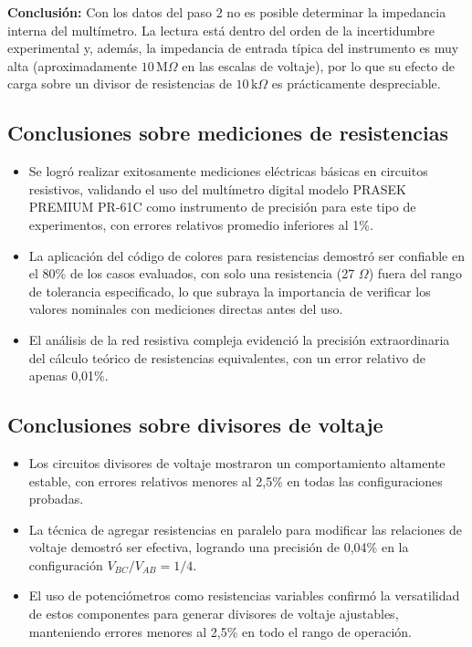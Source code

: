 \documentclass[12pt,a4paper]{article}
\begin{document}
\textbf{Conclusión:}
Con los datos del paso 2 no es posible determinar la impedancia interna del multímetro. La lectura está dentro del orden de la incertidumbre experimental y, además, la impedancia de entrada típica del instrumento es muy alta (aproximadamente $10 \, \mathrm{M}\Omega$ en las escalas de voltaje), por lo que su efecto de carga sobre un divisor de resistencias de $10 \, \mathrm{k}\Omega$ es prácticamente despreciable.

\bigskip
{}

\subsection{Conclusiones sobre mediciones de resistencias}
\begin{itemize}
    \item Se logró realizar exitosamente mediciones eléctricas básicas en circuitos resistivos, validando el uso del multímetro digital modelo PRASEK PREMIUM PR-61C como instrumento de precisión para este tipo de experimentos, con errores relativos promedio inferiores al 1\%.
    \item La aplicación del código de colores para resistencias demostró ser confiable en el 80\% de los casos evaluados, con solo una resistencia (27 $\Omega$) fuera del rango de tolerancia especificado, lo que subraya la importancia de verificar los valores nominales con mediciones directas antes del uso.
    \item El análisis de la red resistiva compleja evidenció la precisión extraordinaria del cálculo teórico de resistencias equivalentes, con un error relativo de apenas 0,01\%.
\end{itemize}

\subsection{Conclusiones sobre divisores de voltaje}
\begin{itemize}
    \item Los circuitos divisores de voltaje mostraron un comportamiento altamente estable, con errores relativos menores al 2,5\% en todas las configuraciones probadas.
    \item La técnica de agregar resistencias en paralelo para modificar las relaciones de voltaje demostró ser efectiva, logrando una precisión de 0,04\% en la configuración $V_{BC}/V_{AB} = 1/4$.
    \item El uso de potenciómetros como resistencias variables confirmó la versatilidad de estos componentes para generar divisores de voltaje ajustables, manteniendo errores menores al 2,5\% en todo el rango de operación.
\end{itemize}
\end{document}
